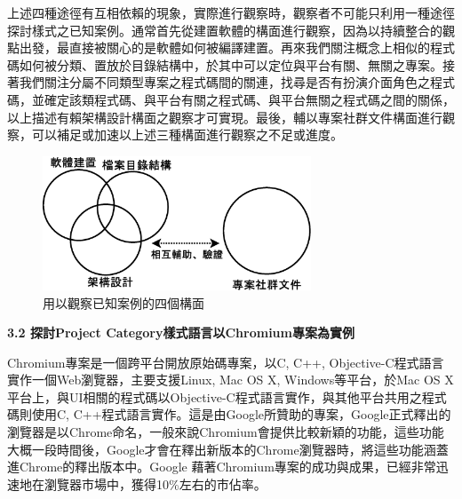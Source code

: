 \documentclass[10pt, twocolumn]{article}
\begin{document}
上述四種途徑有互相依賴的現象，實際進行觀察時，觀察者不可能只利用一種途徑探討樣式之已知案例。通常首先從建置軟體的構面進行觀察，因為以持續整合的觀點出發，最直接被關心的是軟體如何被編譯建置。再來我們關注概念上相似的程式碼如何被分類、置放於目錄結構中，於其中可以定位與平台有關、無關之專案。接著我們關注分屬不同類型專案之程式碼間的關連，找尋是否有扮演介面角色之程式碼，並確定該類程式碼、與平台有關之程式碼、與平台無關之程式碼之間的關係，以上描述有賴架構設計構面之觀察才可實現。最後，輔以專案社群文件構面進行觀察，可以補足或加速以上述三種構面進行觀察之不足或進度。

\begin{figure}
\begin{center}
\includegraphics[width=8cm]{observation_view.eps}
\caption{用以觀察已知案例的四個構面}
\label{observation-view}
\end{center}
\end{figure}

\begin{raggedright}\textbf{3.2 探討Project Category樣式語言以Chromium專案為實例}\end{raggedright}

Chromium專案是一個跨平台開放原始碼專案，以C, C++, Objective-C程式語言實作一個Web瀏覽器，主要支援Linux, Mac OS X, Windows等平台，於Mac OS X平台上，與UI相關的程式碼以Objective-C程式語言實作，與其他平台共用之程式碼則使用C, C++程式語言實作。這是由Google所贊助的專案，Google正式釋出的瀏覽器是以Chrome命名，一般來說Chromium會提供比較新穎的功能，這些功能大概一段時間後，Google才會在釋出新版本的Chrome瀏覽器時，將這些功能涵蓋進Chrome的釋出版本中。Google 藉著Chromium專案的成功與成果，已經非常迅速地在瀏覽器市場中，獲得10\%左右的市佔率\cite{browsermarketshare}。
\end{document}
